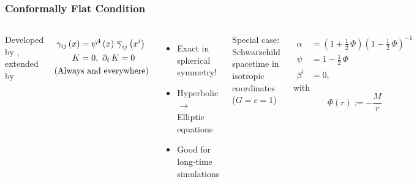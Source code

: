 \documentclass{beamer}
\begin{document}
\begin{frame}
\frametitle{Conformally Flat Condition}

  \begin{columns}[c]


      Developed by \citet{wmm1996}, extended by \citet{ccd2009}

      \begin{align*}
        \gamma_{ij}\left(x\right)
        &=\psi^{4}\left(x\right)\,\overline{\gamma}_{ij}\left(x^{i}\right) \\
        K&=0,\ \p_{t}\,K=0 \\
        &\hspace{-3em}\mathrm{(Always\ and\ everywhere)}
      \end{align*}\vspace{1em}

      \begin{itemize}
        \item Exact in spherical symmetry!
        \item Hyperbolic $\rightarrow$ Elliptic equations
        \item Good for long-time simulations
      \end{itemize}


      Special case: Schwarzchild spacetime in isotropic coordinates
      ($G=c=1$)

      \begin{align*}
        \alpha
          &=\left(1+\frac{1}{2}\,\Phi\right)
            \left(1-\frac{1}{2}\,\Phi\right)^{-1} \\
        \psi
          &=1-\frac{1}{2}\,\Phi \\
        \beta^{i}
          &=0,
      \end{align*}
      with
      \begin{equation*}
        \Phi\left(r\right):=-\frac{M}{r}
      \end{equation*}

  \end{columns}

\end{frame}
\end{document}
